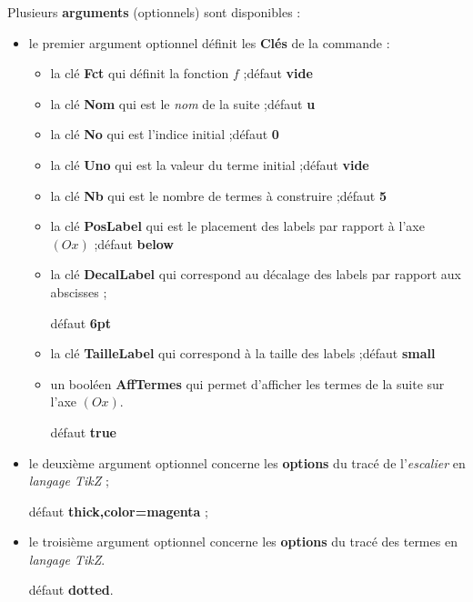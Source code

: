 \documentclass[a4paper,french,11pt]{article}
\providecommand\tikzlogo{Ti\textit{k}Z}
\let\TikZ\tikzlogo
\newcommand\Cle[1]{{\bfseries\sffamily\textlangle \textcolor{orange!75!black}{#1}\textrangle}}
\begin{document}
\begin{cautionblock}
Plusieurs \Cle{arguments} (optionnels) sont disponibles :

\begin{itemize}
	\item le premier argument optionnel définit les \Cle{Clés} de la commande :
	\begin{itemize}
		\item la clé \Cle{Fct} qui définit la fonction $f$ ;\hfill{}défaut \Cle{vide}
		\item la clé \Cle{Nom} qui est le \textit{nom} de la suite ;\hfill{}défaut \Cle{u}
		\item la clé \Cle{No} qui est l'indice initial ;\hfill{}défaut \Cle{0}
		\item la clé \Cle{Uno} qui est la valeur du terme initial ;\hfill{}défaut \Cle{vide}
		\item la clé \Cle{Nb} qui est le nombre de termes à construire ;\hfill{}défaut \Cle{5}
		\item la clé \Cle{PosLabel} qui est le placement des labels par rapport à l'axe $(Ox)$ ;\hfill{}défaut \Cle{below}
		\item la clé \Cle{DecalLabel} qui correspond au décalage des labels par rapport aux abscisses ;
		
		\hfill{}défaut \Cle{6pt}
		\item la clé \Cle{TailleLabel} qui correspond à la taille des labels ;\hfill{}défaut \Cle{small}
		\item un booléen \Cle{AffTermes} qui permet d'afficher les termes de la suite sur l'axe $(Ox)$.
		
		\hfill{}défaut \Cle{true}
	\end{itemize}
	\item le deuxième argument optionnel concerne les \Cle{options} du tracé de l'\textit{escalier} en \textit{langage \TikZ} ;
	
	\hfill{}défaut \Cle{thick,color=magenta} ;
	\item le troisième argument optionnel concerne les \Cle{options} du tracé des termes en \textit{langage \TikZ}.
	
	\hfill{}défaut \Cle{dotted}.
\end{itemize}
\vspace*{-\baselineskip}\leavevmode
\end{cautionblock}
\end{document}
